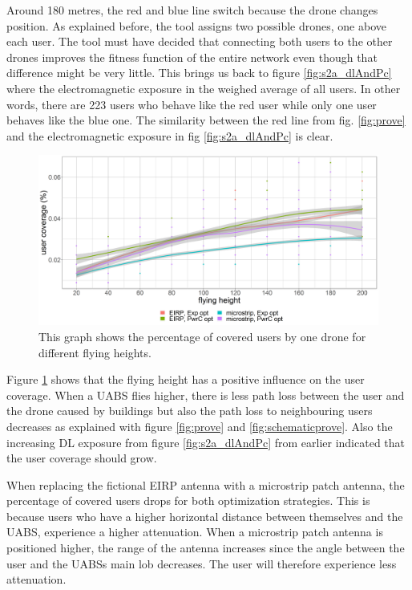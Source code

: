 Around 180 metres, the  red and blue line switch because the drone changes position. As explained before, the tool assigns two possible drones, one above 
each user. The tool must have decided that connecting both users to the other drones improves the fitness function of the entire network even though that difference might be 
very little. This brings us back to figure \ref{fig:s2a_dlAndPc} where the electromagnetic exposure in the weighed average of all users. In other words, there are 223 users who behave like the  red user while only
one user behaves like the blue one. The similarity between the red line from fig. \ref{fig:prove}  and  the electromagnetic exposure in fig  \ref{fig:s2a_dlAndPc} is clear.

\begin{figure}[h]
  \includegraphics[width=\textwidth]{../results/s2/fhvscov.png}
  \caption{This graph shows the percentage of covered users by one drone for different flying heights.}
  \label{fig:s2fhvscov}
\end{figure}

Figure  \ref{fig:s2fhvscov} shows that the flying height has a positive influence on the user coverage. 
When a \gls{UABS} flies higher, there is less path loss between the user and the drone caused by buildings but also the path loss to neighbouring 
users decreases as explained 
with figure \ref{fig:prove} and \ref{fig:schematicprove}. 
Also the increasing \gls{DL} exposure  from figure \ref{fig:s2a_dlAndPc} from earlier indicated that the
user coverage should grow.

When replacing the fictional \gls{EIRP} antenna with a microstrip patch antenna, the percentage of covered users drops for both 
optimization strategies. This is because users who have a higher horizontal distance between themselves and the \gls{UABS}, 
experience a higher attenuation. When a microstrip patch antenna is positioned higher, the range of the antenna increases 
since the angle between the user and the \gls{UABS}s main lob decreases. The user will therefore experience less attenuation.

